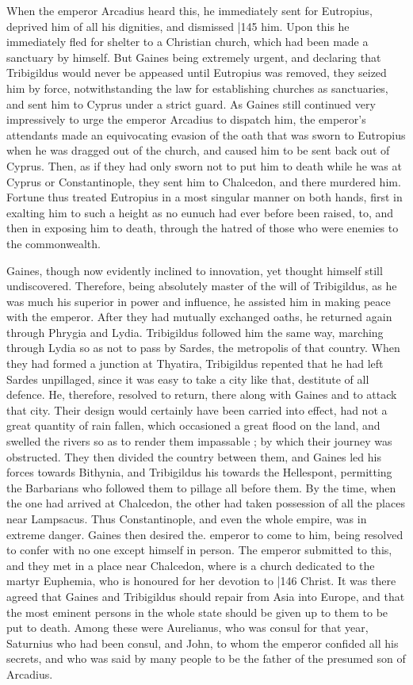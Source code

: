 When the emperor Arcadius heard this, he immediately sent for Eutropius, deprived him of all his dignities, and dismissed
|145 him. Upon this he immediately fled for shelter to a Christian church, which had been made a sanctuary by himself. But Gaines being extremely urgent, and declaring that Tribigildus
would never be appeased until Eutropius was removed, they seized him by force, notwithstanding the law for establishing churches as sanctuaries, and sent him to Cyprus under a strict guard. As Gaines still continued very impressively to urge the emperor Arcadius to dispatch him, the emperor's attendants made an equivocating evasion of the oath that was sworn to Eutropius
when he was dragged out of the church, and caused him to be sent back out of Cyprus. Then, as if they had only sworn not to put him to death while he was at Cyprus or Constantinople, they sent him to Chalcedon, and there murdered him. Fortune thus treated Eutropius in a most singular manner on both hands, first in exalting him to such a height as no eunuch had ever before been raised, to, and then in exposing him to death, through the hatred of those who were enemies to the commonwealth.

Gaines, though now evidently inclined to innovation, yet thought himself still undiscovered. Therefore, being absolutely master of the will of Tribigildus, as he was much his superior in power and influence, he assisted him in making peace with the emperor. After they had mutually exchanged oaths, he returned again through Phrygia and Lydia. Tribigildus followed him the
same way, marching through Lydia so as not to pass by Sardes, the metropolis of that country. When they had formed a junction at Thyatira, Tribigildus repented that he had left Sardes unpillaged, since it was easy to take a city like that, destitute of all defence. He, therefore, resolved to return, there along with Gaines and to attack that city. Their design would certainly have been carried into effect, had not a great quantity of rain fallen, which occasioned a great flood on the land, and swelled the rivers so as to render them impassable ; by which their journey was obstructed. They then divided the country between them, and Gaines led his forces towards Bithynia, and Tribigildus his towards the Hellespont, permitting the Barbarians who followed them to pillage all before them. By the time, when the one had arrived at Chalcedon, the other had taken possession of all the places near Lampsacus. Thus Constantinople, and even the whole empire, was in extreme danger. Gaines then desired the. emperor to come to him, being resolved to confer with no one except himself in person. The emperor submitted to this, and they met in a place near Chalcedon, where is a church dedicated to the martyr Euphemia, who is honoured for her devotion to
|146 Christ. It was there agreed that Gaines and Tribigildus should repair from Asia into Europe, and that the most eminent persons in the whole state should be given up to them to be put to death. Among these were Aurelianus, who was consul for that year, Saturnius who had been consul, and John, to whom the emperor confided all his secrets, and who was said by many people to be the father of the presumed son of Arcadius.

